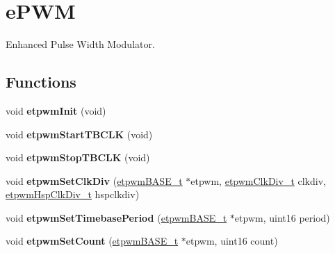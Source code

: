 \hypertarget{group__ePWM}{}\section{e\+P\+WM}
\label{group__ePWM}


Enhanced Pulse Width Modulator.  


\subsection*{Functions}
\begin{DoxyCompactItemize}
\item 
\mbox{\label{group__ePWM_gaa36a31d75f1bd6bbc7a6b9a700906f25}} 
void {\bfseries etpwm\+Init} (void)
\item 
\mbox{\label{group__ePWM_ga6401697f1ffe902d11834670988086eb}} 
void {\bfseries etpwm\+Start\+T\+B\+C\+LK} (void)
\item 
\mbox{\label{group__ePWM_gaffb59f57ade98277fcc05b5b54c0e565}} 
void {\bfseries etpwm\+Stop\+T\+B\+C\+LK} (void)
\item 
\mbox{\label{group__ePWM_gac53c75846a194b544739c4ceedce78f7}} 
void {\bfseries etpwm\+Set\+Clk\+Div} (\mbox{\hyperlink{reg__etpwm_8h_a3030c3a8f18ffd60ee3de5bbd7632891}{etpwm\+B\+A\+S\+E\+\_\+t}} $\ast$etpwm, \mbox{\hyperlink{etpwm_8h_a40fbcc6a1155b920da544379bbc92fa8}{etpwm\+Clk\+Div\+\_\+t}} clkdiv, \mbox{\hyperlink{etpwm_8h_a603247d44887d7615ab1fba25f777d14}{etpwm\+Hsp\+Clk\+Div\+\_\+t}} hspclkdiv)
\item 
\mbox{\label{group__ePWM_ga6b87a58164fd77f15f0a4d82c8a9a39a}} 
void {\bfseries etpwm\+Set\+Timebase\+Period} (\mbox{\hyperlink{reg__etpwm_8h_a3030c3a8f18ffd60ee3de5bbd7632891}{etpwm\+B\+A\+S\+E\+\_\+t}} $\ast$etpwm, uint16 period)
\item 
\mbox{\label{group__ePWM_gafb224271e9a5f14c1547228817192cba}} 
void {\bfseries etpwm\+Set\+Count} (\mbox{\hyperlink{reg__etpwm_8h_a3030c3a8f18ffd60ee3de5bbd7632891}{etpwm\+B\+A\+S\+E\+\_\+t}} $\ast$etpwm, uint16 count)
\item 
\mbox{\label{group__ePWM_ga4a7338a71bf7cd0740caf5187c80b5c8}} 

\end{DoxyCompactItemize}

